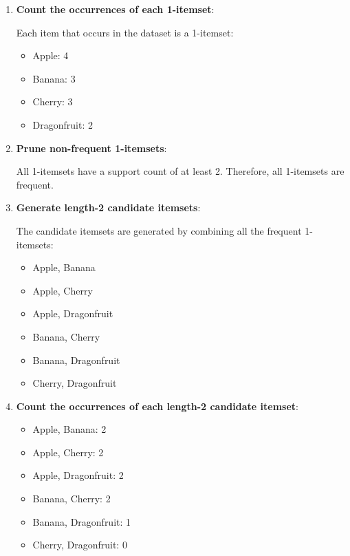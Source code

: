 \documentclass[
english,
smallborders
]{i6prcsht}
\begin{document}
\begin{solution}
	\begin{enumerate}
		\item \textbf{Count the occurrences of each 1-itemset}:
		      
		      Each item that occurs in the dataset is a 1-itemset:
		      
		      \begin{itemize}
			      \item Apple: 4
			      \item Banana: 3
			      \item Cherry: 3
			      \item Dragonfruit: 2
		      \end{itemize}
		      
		\item \textbf{Prune non-frequent 1-itemsets}:
		      
		      All 1-itemsets have a support count of at least 2. Therefore, all 1-itemsets are frequent.
		      
		\item \textbf{Generate length-2 candidate itemsets}:
		      
		      The candidate itemsets are generated by combining all the frequent 1-itemsets:
		      
		      \begin{itemize}
			      \item Apple, Banana
			      \item Apple, Cherry
			      \item Apple, Dragonfruit
			      \item Banana, Cherry
			      \item Banana, Dragonfruit
			      \item Cherry, Dragonfruit
		      \end{itemize}
		      
		\item \textbf{Count the occurrences of each length-2 candidate itemset}:
		      
		      \begin{itemize}
			      \item Apple, Banana: 2
			      \item Apple, Cherry: 2
			      \item Apple, Dragonfruit: 2
			      \item Banana, Cherry: 2
			      \item Banana, Dragonfruit: 1
			      \item Cherry, Dragonfruit: 0
		      \end{itemize}
		      

\end{enumerate}
\end{solution}
\end{document}

